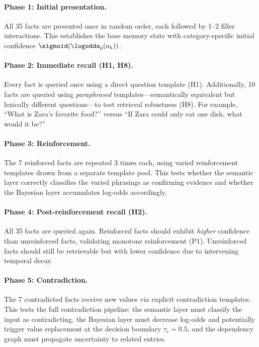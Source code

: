 \paragraph{Phase 1: Initial presentation.}
All 35 facts are presented once in random order, each followed by 1--2 filler interactions. This establishes the base memory state with category-specific initial confidence $\sigmoid(\logodds_0(a_k))$.

\paragraph{Phase 2: Immediate recall (H1, H8).}
Every fact is queried once using a direct question template (H1). Additionally, 10 facts are queried using \emph{paraphrased} templates---semantically equivalent but lexically different questions---to test retrieval robustness (H8). For example, ``What is Zara's favorite food?'' versus ``If Zara could only eat one dish, what would it be?''

\paragraph{Phase 3: Reinforcement.}
The 7 reinforced facts are repeated 3 times each, using varied reinforcement templates drawn from a separate template pool. This tests whether the semantic layer correctly classifies the varied phrasings as confirming evidence and whether the Bayesian layer accumulates log-odds accordingly.

\paragraph{Phase 4: Post-reinforcement recall (H2).}
All 35 facts are queried again. Reinforced facts should exhibit \emph{higher} confidence than unreinforced facts, validating monotone reinforcement (P1). Unreinforced facts should still be retrievable but with lower confidence due to intervening temporal decay.

\paragraph{Phase 5: Contradiction.}
The 7 contradicted facts receive new values via explicit contradiction templates. This tests the full contradiction pipeline: the semantic layer must classify the input as contradicting, the Bayesian layer must decrease log-odds and potentially trigger value replacement at the decision boundary $\tau_r = 0.5$, and the dependency graph must propagate uncertainty to related entries.

